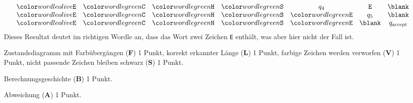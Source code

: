 \begin{loesung}
\begin{teilaufgaben}
\[\begin{array}{ccccccc}
\oliv{E}&\gruen{C}&\gruen{H}&\gruen{S}&q_4        &\schwarz{E}&\blank\\
\oliv{E}&\gruen{C}&\gruen{H}&\gruen{S}&\gruen{E}&q_5        &\blank\\
\oliv{E}&\gruen{C}&\gruen{H}&\gruen{S}&\gruen{E}&\blank     &q_{\text{accept}}\\
\end{array}
\]
Dieses Resultat deutet im richtigen Wordle an, dass das Wort
zwei Zeichen \texttt{E} enthält, was aber hier nicht der Fall ist.
\qedhere
\end{teilaufgaben}
\end{loesung}

\begin{bewertung}
\begin{teilaufgaben}
\item
Zustandsdiagramm mit Farbübergängen ({\bf F}) 1 Punkt,
korrekt erkannter Länge ({\bf L}) 1 Punkt,
farbige Zeichen werden verworfen ({\bf V}) 1 Punkt,
nicht passende Zeichen bleiben schwarz ({\bf S}) 1 Punkt.
\item
Berechnungsgeschichte ({\bf B}) 1 Punkt.
\item
Abweichung ({\bf A}) 1 Punkt.
\end{teilaufgaben}
\end{bewertung}
\egroup
